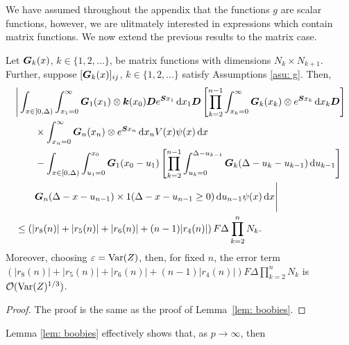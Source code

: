 We have assumed throughout the appendix that the functions \(g\) are scalar functions, however, we are ulitmately interested in expressions which contain matrix functions. We now extend the previous results to the matrix case.
\begin{lem}\label{lem: boobies2}
	Let \(\boldsymbol G_k(x)\), \(k\in\{1,2,...\}\), be matrix functions with dimensions \(N_k \times N_{k+1}\). Further, suppose \([\boldsymbol G_k(x)]_{ij}\), \(k\in\{1,2,...\}\) satisfy Assumptions \ref{asu: g}. Then, 
	\begin{align}
		&\Bigg| \int_{x\in[0,\Delta)} \int_{x_1=0}^\infty \boldsymbol G_1(x_1) \otimes \boldsymbol k(x_0) \boldsymbol D e^{\boldsymbol{S}x_1}\, \mathrm{d} x_1\boldsymbol D 
				\left[\prod_{k=2}^{n-1}\int_{x_k=0}^\infty \boldsymbol G_{k}(x_k) \otimes e^{\boldsymbol{S}x_k} \, \mathrm{d} x_k
		\boldsymbol D\right] \nonumber 
				\\&\qquad{}\times\int_{x_n=0}^\infty \boldsymbol G_{n}(x_n) \otimes e^{\boldsymbol{S}x_n} \, \mathrm{d} x_n V(x) \psi(x)\, \mathrm{d} x \nonumber 
		\\&\qquad {}- \int_{x\in[0,\Delta)} \int_{u_1=0}^{x_0}\boldsymbol G_1(x_0 - u_1)
		\left[\prod_{k=2}^{n-1} \int_{u_k=0}^{\Delta-u_{k-1}} \boldsymbol {G}_{k}(\Delta-u_k-u_{k-1})\, \mathrm{d} u_{k-1}\right] \nonumber 
				\\&\qquad{} \boldsymbol G_{n}(\Delta - x-u_{n-1})
	 		\times1(\Delta-x-u_{n-1}\geq0)\, \mathrm{d} u_{n-1}\psi(x)\, \mathrm{d} x \Bigg| \nonumber
		\\&\leq \left(|r_8(n)|+|r_5(n)|+|r_6(n)| + (n-1)|r_4(n)|\right)F\Delta \prod_{k=2}^{n}N_{k}.\label{eqn: KAFnnmna22G}
	\end{align}
	Moreover, choosing \(\varepsilon=\mathrm{Var}(Z)\), then, for fixed \(n\), the error term \(\left(|r_8(n)|+|r_5(n)|+|r_6(n)| + (n-1)|r_4(n)|\right)F\Delta \prod_{k=2}^{n}N_{k}\) is \(\mathcal O(\mathrm{Var}(Z)^{1/3})\). 
\end{lem}
\begin{proof}
	The proof is the same as the proof of Lemma~\ref{lem: boobies}.
\end{proof}
Lemma \ref{lem: boobies} effectively shows that, as \(p \to \infty\), then 
